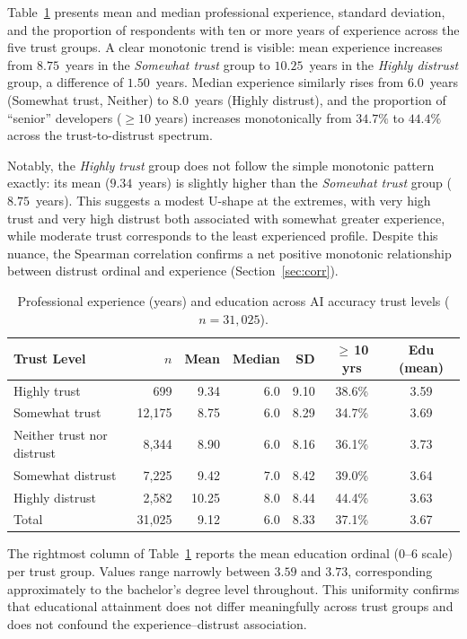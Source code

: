 \documentclass[11pt,a4paper]{article}
\begin{document}
Table~\ref{tab:main} presents mean and median professional experience, standard deviation,
and the proportion of respondents with ten or more years of experience across the five
trust groups. A clear monotonic trend is visible: mean experience increases from
$8.75$~years in the \emph{Somewhat trust} group to $10.25$~years in the
\emph{Highly distrust} group, a difference of $1.50$~years. Median experience similarly
rises from $6.0$~years (Somewhat trust, Neither) to $8.0$~years (Highly distrust),
and the proportion of ``senior'' developers ($\geq 10$ years) increases monotonically
from $34.7\%$ to $44.4\%$ across the trust-to-distrust spectrum.

Notably, the \emph{Highly trust} group does not follow the simple monotonic pattern
exactly: its mean ($9.34$~years) is slightly higher than the \emph{Somewhat trust} group
($8.75$~years). This suggests a modest U-shape at the extremes, with very high trust
and very high distrust both associated with somewhat greater experience, while moderate
trust corresponds to the least experienced profile. Despite this nuance, the Spearman
correlation confirms a net positive monotonic relationship between distrust ordinal and
experience (Section~\ref{sec:corr}).

\begin{table}[ht]
\centering
\caption{Professional experience (years) and education across AI accuracy trust levels ($n = 31{,}025$).}
\label{tab:main}
\renewcommand{\arraystretch}{1.15}
\begin{tabular}{lrrrrcc}
\toprule
Trust Level & $n$ & Mean & Median & SD & $\geq$\,10 yrs & Edu (mean) \\
\midrule
Highly trust               &    699 &  9.34 & 6.0 & 9.10 & 38.6\% & 3.59 \\
Somewhat trust             & 12{,}175 & 8.75 & 6.0 & 8.29 & 34.7\% & 3.69 \\
Neither trust nor distrust &  8{,}344 & 8.90 & 6.0 & 8.16 & 36.1\% & 3.73 \\
Somewhat distrust          &  7{,}225 & 9.42 & 7.0 & 8.42 & 39.0\% & 3.64 \\
Highly distrust            &  2{,}582 & 10.25 & 8.0 & 8.44 & 44.4\% & 3.63 \\
\midrule
Total                      & 31{,}025 & 9.12 & 6.0 & 8.33 & 37.1\% & 3.67 \\
\bottomrule
\end{tabular}
\end{table}

The rightmost column of Table~\ref{tab:main} reports the mean education ordinal (0--6
scale) per trust group. Values range narrowly between $3.59$ and $3.73$, corresponding
approximately to the bachelor's degree level throughout. This uniformity confirms that
educational attainment does not differ meaningfully across trust groups and does not
confound the experience--distrust association.
\end{document}
